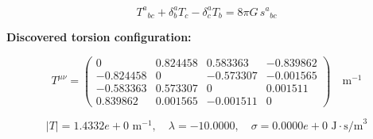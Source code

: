 
\begin{equation}
  T^a{}_{bc} + \delta^a_b T_c - \delta^a_c T_b = 8\pi G \, s^a{}_{bc}
\end{equation}

\textbf{Discovered torsion configuration:}

\begin{equation}
  T^{\mu\nu} = \begin{pmatrix}
    0 & 0.824458 & 0.583363 & -0.839862 \\
    -0.824458 & 0 & -0.573307 & -0.001565 \\
    -0.583363 & 0.573307 & 0 & 0.001511 \\
    0.839862 & 0.001565 & -0.001511 & 0
  \end{pmatrix} \quad \text{m}^{-1}
\end{equation}

\begin{equation}
  |T| = 1.4332e+0 \text{ m}^{-1}, \quad
  \lambda = -10.0000, \quad
  \sigma = 0.0000e+0 \text{ J}\cdot\text{s/m}^3
\end{equation}